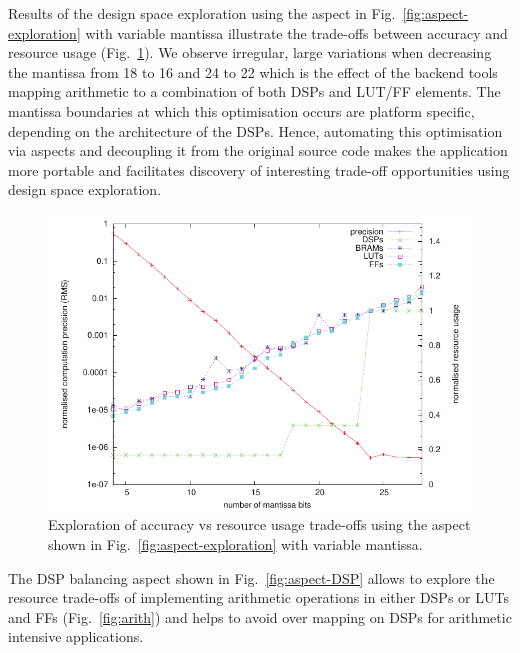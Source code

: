 Results of the design space exploration using the aspect in
Fig.~\ref{fig:aspect-exploration} with variable mantissa illustrate
the trade-offs between accuracy and resource usage
(Fig.~\ref{fig:precision}). We observe irregular, large variations
when decreasing the mantissa from 18 to 16 and 24 to 22 which is the
effect of the backend tools mapping arithmetic to a combination of
both DSPs and LUT/FF elements. The mantissa boundaries at which this
optimisation occurs are platform specific, depending on the
architecture of the DSPs. Hence, automating this optimisation via
aspects and decoupling it from the original source code makes the
application more portable and facilitates discovery of interesting
trade-off opportunities using design space exploration.

\begin{figure}[!h]
\centering
\includegraphics{figs/pre}
\caption{Exploration of accuracy vs resource usage trade-offs using the aspect
shown in Fig.~\ref{fig:aspect-exploration} with variable mantissa.}
\label{fig:precision}
\end{figure}

The DSP balancing aspect shown in Fig.~\ref{fig:aspect-DSP} allows to
explore the resource trade-offs of implementing arithmetic operations
in either DSPs or LUTs and FFs (Fig.~\ref{fig:arith}) and helps to
avoid over mapping on DSPs for arithmetic intensive applications.

